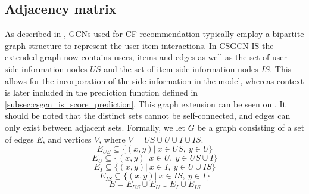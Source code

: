 \subsection{Adjacency matrix}\label{subsec:csgcn_is_adj_mat}
As described in , GCNs used for CF recommendation typically employ a bipartite graph structure to represent the user-item interactions.
In CSGCN-IS the extended graph now contains users, items and edges as well as the set of user side-information nodes $US$ and the set of item side-information nodes $IS$.
This allows for the incorporation of the side-information in the model, whereas context is later included in the prediction function defined in \autoref{subsec:csgcn_is_score_prediction}.
This graph extension can be seen on .
It should be noted that the distinct sets cannot be self-connected, and edges can only exist between adjacent sets.
Formally, we let $G$ be a graph consisting of a set of edges $E$, and vertices $V$, where $V = US \cup U \cup I \cup IS$.
$$E_{US} \subseteq \{ (x,y) | \: x \in US, \: y \in U  \}$$
$$E_U \subseteq \{ (x,y) | \: x \in U, \: y \in US \cup I \}$$
$$E_I \subseteq \{ (x,y) | \: x \in I, \: y \in U \cup IS \}$$
$$E_{IS} \subseteq \{ (x,y) | \: x \in IS, \: y \in I  \}$$
$$E = E_{US} \cup E_{U} \cup E_{I} \cup E_{IS} $$

